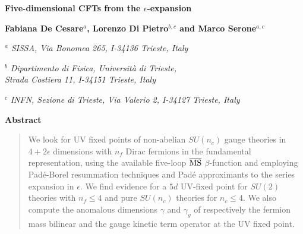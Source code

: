 \documentclass [11pt]{article}
\begin{document}
\thispagestyle{empty}

\begin{center}

	\vspace*{-.6cm}

	\begin{center}

		\vspace*{1.1cm}

		{\centering \Large\textbf{Five-dimensional CFTs from the $\epsilon$-expansion}}

	\end{center}

	\vspace{0.8cm}
	{\bf Fabiana De Cesare$^{a}$, Lorenzo Di Pietro$^{b,c}$ and Marco Serone$^{a,c}$}

	\vspace{1.cm}
	
	${}^a\!\!$
	{\em SISSA, Via Bonomea 265, I-34136 Trieste, Italy}

	\vspace{.3cm}

	${}^b\!\!$
	{\em  Dipartimento di Fisica, Universit\`a di Trieste, \\ Strada Costiera 11, I-34151 Trieste, Italy}
		
	\vspace{.3cm}

	${}^c\!\!$
	{\em INFN, Sezione di Trieste, Via Valerio 2, I-34127 Trieste, Italy}

	\vspace{.3cm}

\end{center}

\vspace{1cm}

\centerline{\bf Abstract}
\vspace{2 mm}
\begin{quote}

We look for UV fixed points of non-abelian $SU(n_c)$ gauge theories in $4+2\epsilon$ dimensions with $n_f$ Dirac fermions in the fundamental representation, 
using the available five-loop $\overline{{\rm MS}}$ $\beta$-function and employing Pad\'e-Borel resummation techniques and Pad\'e approximants to the series expansion in $\epsilon$.
We find evidence for a $5d$ UV-fixed point for $SU(2)$ theories with $n_f\leq 4$ and pure $SU(n_c)$ theories for $n_c\leq 4$. 
We also compute the anomalous dimensions $\gamma$ and $\gamma_g$ of respectively the fermion mass bilinear and the gauge kinetic term operator at the UV fixed point.

\end{quote}
\end{document}
